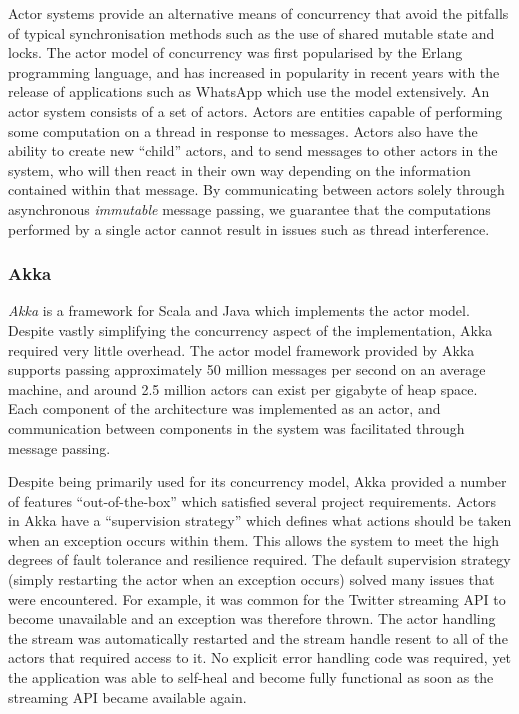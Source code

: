 \documentclass{l4proj}
\begin{document}
Actor systems provide an alternative means of concurrency that avoid the pitfalls of typical synchronisation methods such as the use of shared mutable state and locks. The actor model of concurrency was first popularised by the Erlang programming language, and has increased in popularity in recent years with the release of applications such as WhatsApp which use the model extensively. An actor system consists of a set of actors. Actors are entities capable of performing some computation on a thread in response to messages. Actors also have the ability to create new “child” actors, and to send messages to other actors in the system, who will then react in their own way depending on the information contained within that message. By communicating between actors solely through asynchronous \textit{immutable} message passing, we guarantee that the computations performed by a single actor cannot result in issues such as thread interference.

\subsubsection{Akka}

    \textit{Akka} is a framework for Scala and Java which implements the actor model. Despite vastly simplifying the concurrency aspect of the implementation, Akka required very little overhead. The actor model framework provided by Akka supports passing approximately 50 million messages per second on an average machine, and around 2.5 million actors can exist per gigabyte of heap space. Each component of the architecture was implemented as an actor, and communication between components in the system was facilitated through message passing.
            
        
        Despite being primarily used for its concurrency model, Akka provided a number of features ``out-of-the-box'' which satisfied several project requirements. Actors in Akka have a “supervision strategy” which defines what actions should be taken when an exception occurs within them. This allows the system to meet the high degrees of fault tolerance and resilience required. The default supervision strategy (simply restarting the actor when an exception occurs) solved many issues that were encountered. For example, it was common for the Twitter streaming API to become unavailable and an exception was therefore thrown. The actor handling the stream was automatically restarted and the stream handle resent to all of the actors that required access to it. No explicit error handling code was required, yet the application was able to self-heal and become fully functional as soon as the streaming API became available again.
\end{document}
